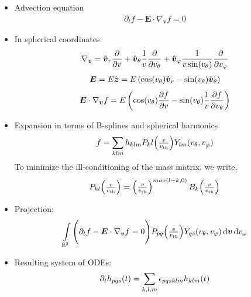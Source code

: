 \documentclass[mathserif, aspectratio=169]{beamer}
\newcommand{\ud}{\,\mathrm{d}}
\newcommand{\vect}[1]{\boldsymbol{#1}}
\newcommand{\of}[1]{\mleft( #1 \mright)}
\newcommand{\vth}{v_{\textrm{th}}}
\newcommand{\reals}{\mathbb{R}}
\newcommand{\myint}{\int\limits}
\newcommand{\vr}{v}
\newcommand{\vtheta}{v_{\theta}}
\newcommand{\vphi}{v_{\varphi}}
\newcommand{\vomega}{v_{\omega}}
\newcommand{\vrunit}{\hat{\vect{v}}_{r}}
\newcommand{\vthetaunit}{\hat{\vect{v}}_{\theta}}
\newcommand{\vphiunit}{\hat{\vect{v}}_{\varphi}}
\begin{document}
\begin{frame}
\begin{itemize}
\item Advection equation
\begin{align*}
\partial_t f - \vect{E} \cdot \nabla_{\vect{v }}f = 0
\end{align*}
\item In spherical coordinates
\begin{align*}
\nabla_{\vect{v}} 
= \vrunit \frac{\partial}{\partial \vr}
+ \vthetaunit \frac{1}{\vr} \frac{\partial}{\partial \vtheta}
+ \vphiunit \frac{1}{\vr \sin\of{\vtheta}} \frac{\partial}{\partial \vphi}
\end{align*}
\begin{align*}
\vect{E} 
= E \hat{\vect{z}} 
= E \left( \cos\of{\vtheta} \vrunit - \sin\of{\vtheta} \vthetaunit \right)
\end{align*}
\begin{align*}
\vect{E}\cdot \nabla_{\vect{v}} f
= E 
\left( \cos\of{\vtheta} \frac{\partial f}{\partial \vr} 
- \sin\of{\vtheta} \frac{1}{\vr} \frac{\partial f}{\partial \vtheta} \right)
\end{align*}

\end{itemize}
%
\end{frame}

\begin{frame}

\begin{itemize}

\item Expansion in terms of B-splines and spherical harmonics
\begin{align*}
f = \sum_{klm} h_{klm} P_kl\of{\textstyle\frac{v}{\vth}} Y_{lm}\of{\vtheta,\vphi} \\
\end{align*}
To minimize the ill-conditioning  of the mass matrix, we write, 
\begin{align}
P_{kl}\of{\textstyle\frac{v}{\vth}} = \left(\textstyle\frac{v}{\vth}\right)^{max(l-k,0)} B_k\of{\textstyle\frac{v}{\vth}}
\end{align}


\item  Projection:
\begin{align*}
\myint_{\reals^3} \Bigg( \partial_t f - \vect{E} \cdot \nabla_{\vect{v }}f = 0 \Bigg) P_{pq}\of{\textstyle\frac{v}{\vth}} Y_{qs}\of{\vtheta,\vphi} \ud\vect{v} \ud\vomega
\end{align*}

\item Resulting system of ODEs:
\begin{align*}
\partial_t h_{pqs}\of{t} = \sum_{k,l,m}  \epsilon_{pqsklm} h_{klm}\of{t}
\end{align*}
\end{itemize}
%
\end{frame}
\end{document}
